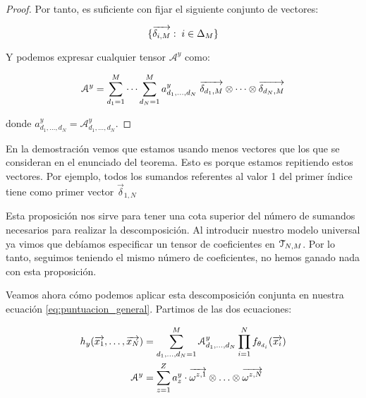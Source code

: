 \begin{proof}
    Por tanto, es suficiente con fijar el siguiente conjunto de vectores:

    \begin{equation}
        \{ \overrightarrow{\delta_{i, M}}: \; i \in \Delta_{M} \}
    \end{equation}

    Y podemos expresar cualquier tensor $\mathcal{A}^y$ como:

    \begin{equation}
        \mathcal{A}^y = \sum_{d_1 = 1}^{M} \cdots \sum_{d_N = 1}^{M} a^y_{d_1, \ldots, d_N} \; \overrightarrow{\delta_{d_1, M}} \otimes \cdots \otimes \overrightarrow{\delta_{d_N, M}}
    \end{equation}

    donde $a^y_{d_1, \ldots, d_N} = \mathcal{A}^y_{d_1, \ldots, d_N}$.

\end{proof}

\begin{observacion}
    En la demostración vemos que estamos usando menos vectores que los que se consideran en el enunciado del teorema. Esto es porque estamos repitiendo estos vectores. Por ejemplo, todos los sumandos referentes al valor 1 del primer índice tiene como primer vector $\vec{\delta}_{1, N}$
\end{observacion}

\begin{observacion}
    Esta proposición nos sirve para tener una cota superior del número de sumandos necesarios para realizar la descomposición. Al introducir nuestro modelo universal ya vimos que debíamos especificar un tensor de coeficientes en $\mathcal{T}_{N, M}$. Por lo tanto, seguimos teniendo el mismo número de coeficientes, no hemos ganado nada con esta proposición.
\end{observacion}

Veamos ahora cómo podemos aplicar esta descomposición conjunta en nuestra ecuación \eqref{eq:puntuacion_general}. Partimos de las dos ecuaciones:

\begin{equation}
	\begin{split}
		h_y(\overrightarrow{x_1}, \ldots, \overrightarrow{x_N}) &= \sum_{d_1, \ldots, d_N = 1}^{M} \mathcal{A}^y_{d_1, \ldots, d_N} \prod_{i = 1}^N f_{\theta_{d_i}}(\overrightarrow{x_i}) \\
		\mathcal{A}^y &= \sum_{z = 1}^Z a_z^y \cdot \overrightarrow{\omega^{z, 1}} \otimes \ldots \otimes \overrightarrow{\omega^{z, N}} \\
	\end{split}
\end{equation}

